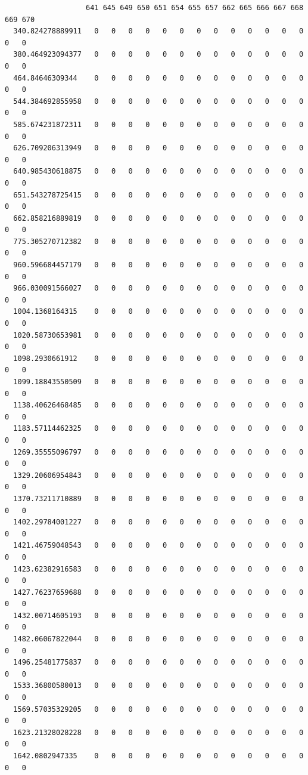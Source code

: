 \documentclass[
  letterpaper,
  DIV=11,
  numbers=noendperiod]{scrartcl}
\begin{document}
\begin{verbatim}
                   641 645 649 650 651 654 655 657 662 665 666 667 668 669 670
  340.824278889911   0   0   0   0   0   0   0   0   0   0   0   0   0   0   0
  380.464923094377   0   0   0   0   0   0   0   0   0   0   0   0   0   0   0
  464.84646309344    0   0   0   0   0   0   0   0   0   0   0   0   0   0   0
  544.384692855958   0   0   0   0   0   0   0   0   0   0   0   0   0   0   0
  585.674231872311   0   0   0   0   0   0   0   0   0   0   0   0   0   0   0
  626.709206313949   0   0   0   0   0   0   0   0   0   0   0   0   0   0   0
  640.985430618875   0   0   0   0   0   0   0   0   0   0   0   0   0   0   0
  651.543278725415   0   0   0   0   0   0   0   0   0   0   0   0   0   0   0
  662.858216889819   0   0   0   0   0   0   0   0   0   0   0   0   0   0   0
  775.305270712382   0   0   0   0   0   0   0   0   0   0   0   0   0   0   0
  960.596684457179   0   0   0   0   0   0   0   0   0   0   0   0   0   0   0
  966.030091566027   0   0   0   0   0   0   0   0   0   0   0   0   0   0   0
  1004.1368164315    0   0   0   0   0   0   0   0   0   0   0   0   0   0   0
  1020.58730653981   0   0   0   0   0   0   0   0   0   0   0   0   0   0   0
  1098.2930661912    0   0   0   0   0   0   0   0   0   0   0   0   0   0   0
  1099.18843550509   0   0   0   0   0   0   0   0   0   0   0   0   0   0   0
  1138.40626468485   0   0   0   0   0   0   0   0   0   0   0   0   0   0   0
  1183.57114462325   0   0   0   0   0   0   0   0   0   0   0   0   0   0   0
  1269.35555096797   0   0   0   0   0   0   0   0   0   0   0   0   0   0   0
  1329.20606954843   0   0   0   0   0   0   0   0   0   0   0   0   0   0   0
  1370.73211710889   0   0   0   0   0   0   0   0   0   0   0   0   0   0   0
  1402.29784001227   0   0   0   0   0   0   0   0   0   0   0   0   0   0   0
  1421.46759048543   0   0   0   0   0   0   0   0   0   0   0   0   0   0   0
  1423.62382916583   0   0   0   0   0   0   0   0   0   0   0   0   0   0   0
  1427.76237659688   0   0   0   0   0   0   0   0   0   0   0   0   0   0   0
  1432.00714605193   0   0   0   0   0   0   0   0   0   0   0   0   0   0   0
  1482.06067822044   0   0   0   0   0   0   0   0   0   0   0   0   0   0   0
  1496.25481775837   0   0   0   0   0   0   0   0   0   0   0   0   0   0   0
  1533.36800580013   0   0   0   0   0   0   0   0   0   0   0   0   0   0   0
  1569.57035329205   0   0   0   0   0   0   0   0   0   0   0   0   0   0   0
  1623.21328028228   0   0   0   0   0   0   0   0   0   0   0   0   0   0   0
  1642.0802947335    0   0   0   0   0   0   0   0   0   0   0   0   0   0   0

\end{verbatim}
\end{document}
